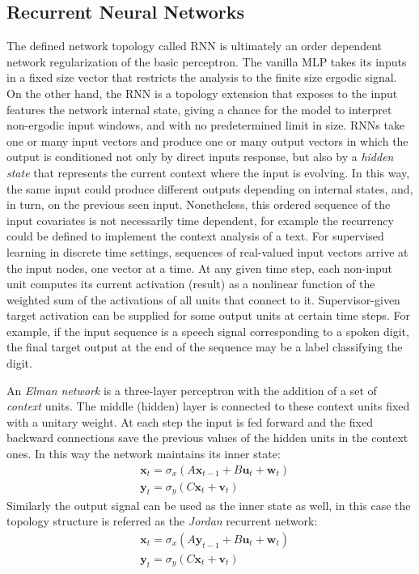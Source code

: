 \subsection{Recurrent Neural Networks}
The defined network topology called \acl{RNN} is ultimately an order dependent network regularization of the basic perceptron. The vanilla \acs{MLP} takes its inputs in a fixed size vector that restricts the analysis to the finite size ergodic signal. On the other hand, the \acs{RNN} is a topology extension that exposes to the input features the network internal state, giving a chance for the model to interpret non-ergodic input windows, and with no predetermined limit in size. \acs{RNN}s take one or many input vectors and produce one or many output vectors in which the output is conditioned not only by direct inputs response, but also by a \textit{hidden state} that represents the current context where the input is evolving. In this way, the same input could produce different outputs depending on internal states, and, in turn, on the previous seen input. Nonetheless, this ordered sequence of the input covariates is not necessarily time dependent, for example the recurrency could be defined to implement the context analysis of a text.
%
For supervised learning in discrete time settings, sequences of real-valued input vectors arrive at the input nodes, one vector at a time. At any given time step, each non-input unit computes its current activation (result) as a nonlinear function of the weighted sum of the activations of all units that connect to it. Supervisor-given target activation can be supplied for some output units at certain time steps. For example, if the input sequence is a speech signal corresponding to a spoken digit, the final target output at the end of the sequence may be a label classifying the digit.

An \textit{Elman network} is a three-layer perceptron with the addition of a set of \textit{context} units. The middle (hidden) layer is connected to these context units fixed with a unitary weight. At each step the input is fed forward and the fixed backward connections save the previous values of the hidden units in the context ones. In this way the network maintains its inner state:
\begin{align}
    & \bm{x}_t = \sigma_x\left( A\bm{x}_{t-1} + B\bm{u}_t + \bm{w}_t \right) \\
    & \bm{y}_t = \sigma_y\left( C\bm{x}_t + \bm{v}_t \right)
    \label{eq:elman_model}
\end{align}
Similarly the output signal can be used as the inner state as well, in this case the topology structure is referred as the \textit{Jordan} recurrent network:
\begin{align}
    & \bm{x}_t = \sigma_x\left( A\bm{y}_{t-1} + B\bm{u}_t + \bm{w}_t \right) \\
    & \bm{y}_t = \sigma_y\left( C\bm{x}_t + \bm{v}_t \right)
    \label{eq:jordan_model}
\end{align}

